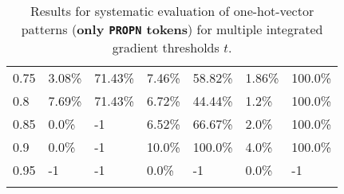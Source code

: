 \begin{table}[t]
\begin{tabular}{lllllll}
\multicolumn{1}{l|}{0.75}&  3.08\% & \multicolumn{1}{l|}{71.43\%}& 7.46\% & \multicolumn{1}{l|}{58.82\%}& 1.86\% & 100.0\%\\ 
\multicolumn{1}{l|}{0.8}&  7.69\% & \multicolumn{1}{l|}{71.43\%}& 6.72\% & \multicolumn{1}{l|}{44.44\%}& 1.2\% & 100.0\%\\ 
\multicolumn{1}{l|}{0.85}&  0.0\% & \multicolumn{1}{l|}{-1}& 6.52\% & \multicolumn{1}{l|}{66.67\%}& 2.0\% & 100.0\%\\ 
\multicolumn{1}{l|}{0.9}&  0.0\% & \multicolumn{1}{l|}{-1}& 10.0\% & \multicolumn{1}{l|}{100.0\%}& 4.0\% & 100.0\%\\ 
\multicolumn{1}{l|}{0.95}&  -1 & \multicolumn{1}{l|}{-1}& 0.0\% & \multicolumn{1}{l|}{-1}& 0.0\% & -1\\ 


\\ \hline
\end{tabular}
\caption[Model Evaluation for only \texttt{PROPN} tokens]{Results for systematic evaluation of one-hot-vector patterns (\textbf{only \texttt{PROPN} tokens}) for multiple integrated gradient thresholds $t$.}
\label{tab:evalResultsPROPN}
\end{table}
	